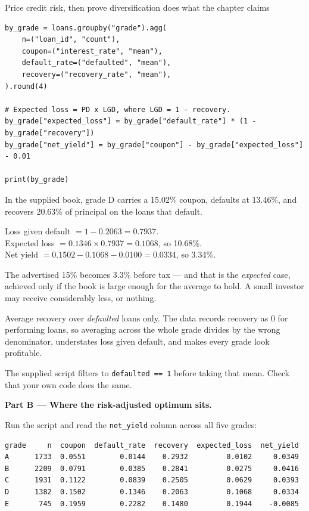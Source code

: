 \begin{labproject}{Price credit risk, then prove diversification does what the chapter claims}
\begin{lstlisting}[style=mlpython]
by_grade = loans.groupby("grade").agg(
    n=("loan_id", "count"),
    coupon=("interest_rate", "mean"),
    default_rate=("defaulted", "mean"),
    recovery=("recovery_rate", "mean"),
).round(4)

# Expected loss = PD x LGD, where LGD = 1 - recovery.
by_grade["expected_loss"] = by_grade["default_rate"] * (1 - by_grade["recovery"])
by_grade["net_yield"] = by_grade["coupon"] - by_grade["expected_loss"] - 0.01

print(by_grade)
\end{lstlisting}

\begin{workedexample}
In the supplied book, grade D carries a 15.02\% coupon, defaults at 13.46\%, and recovers 20.63\% of principal on the loans that default.

\smallskip
Loss given default $= 1 - 0.2063 = 0.7937$.\\
Expected loss $= 0.1346 \times 0.7937 = 0.1068$, so 10.68\%.\\
Net yield $= 0.1502 - 0.1068 - 0.0100 = 0.0334$, so 3.34\%.

\smallskip
The advertised 15\% becomes 3.3\% before tax --- and that is the \emph{expected} case, achieved only if the book is large enough for the average to hold. A small investor may receive considerably less, or nothing.
\end{workedexample}

\begin{pitfall}
Average recovery over \emph{defaulted} loans only. The data records recovery as 0 for performing loans, so averaging across the whole grade divides by the wrong denominator, understates loss given default, and makes every grade look profitable.

The supplied script filters to \texttt{defaulted == 1} before taking that mean. Check that your own code does the same.
\end{pitfall}

\medskip\noindent\textbf{Part B --- Where the risk-adjusted optimum sits.}\par
Run the script and read the \texttt{net\_yield} column across all five grades:

\begin{lstlisting}[style=mlterminal]
grade     n  coupon  default_rate  recovery  expected_loss  net_yield
A      1733  0.0551        0.0144    0.2932         0.0102     0.0349
B      2209  0.0791        0.0385    0.2841         0.0275     0.0416
C      1931  0.1122        0.0839    0.2505         0.0629     0.0393
D      1382  0.1502        0.1346    0.2063         0.1068     0.0334
E       745  0.1959        0.2282    0.1480         0.1944    -0.0085
\end{lstlisting}


\end{labproject}
